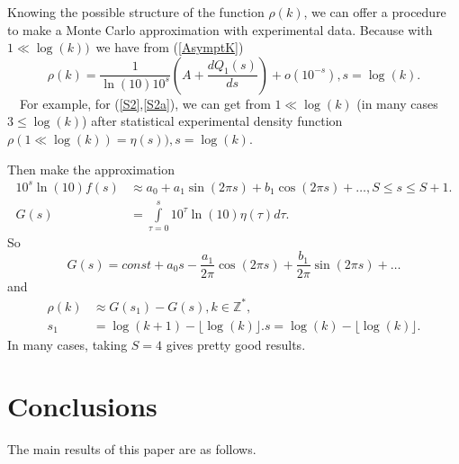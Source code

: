 \documentclass[titlepage,fleqn]{article}%
\providecommand{\U}[1]{\protect\rule{.1in}{.1in}}
\begin{document}
Knowing the possible structure of the function $\rho(k)$, we can offer a
procedure to make a Monte Carlo approximation with experimental data. Because
with $1\ll\log(k))$\ we have from (\ref{AsymptK})%
\[
\rho(k)=\frac{1}{\ln(10)10^{s}}\left(  A+\frac{dQ_{1}(s)}{ds}\right)
+o\left(  10^{-s}\right)  ,s=\log(k).
\]
\ \ For example, for (\ref{S2},\ref{S2a}), we can get from $1\ll\log(k)$ (in
many cases $3\leq\log(k)$) after statistical experimental density function
$\rho(1\ll\log(k))=\eta(s)),s=\log(k).$

Then make the approximation
\begin{align*}
10^{s}\ln(10)f(s)  &  \approx a_{0}+a_{1}\sin(2\pi s)+b_{1}\cos(2\pi
s)+\ldots,S\leq s\leq S+1.\\
G(s)  &  =%
{\displaystyle\int\limits_{\tau=0}^{s}}
10^{\tau}\ln(10)\eta(\tau)d\tau.
\end{align*}
So%
\[
G(s)=const+a_{0}s-\frac{a_{1}}{2\pi}\cos(2\pi s)+\frac{b_{1}}{2\pi}\sin(2\pi
s)+\ldots
\]
and%
\begin{align*}
\rho(k)  &  \approx G(s_{1})-G(s),k\in%
\mathbb{Z}
^{\ast},\\
s_{1}  &  =\log(k+1)-\lfloor\log(k)\rfloor.s=\log(k)-\lfloor\log(k)\rfloor.
\end{align*}
In many cases, taking $S=4$ gives pretty good results.

\section{Conclusions}

The main results of this paper are as follows.
\end{document}
